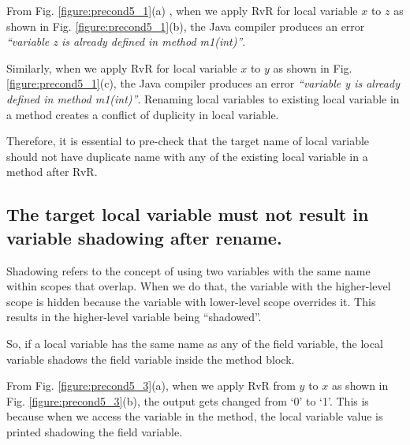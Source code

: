  
From Fig. \ref{figure:precond5_1}(a) , when we apply RvR for local variable $x$ to $z$ as shown in Fig. \ref{figure:precond5_1}(b), the Java compiler produces an error \textit{``variable z is already defined in method m1(int)''}. 

Similarly, when we apply RvR for local variable $x$ to $y$ as shown in Fig. \ref{figure:precond5_1}(c), the Java compiler produces an error \textit{``variable y is already defined in method m1(int)''}. Renaming local variables to existing local variable in a method creates a conflict of duplicity in local variable.

Therefore, it is essential to pre-check that the target name of local variable should not have duplicate name with any of the existing local variable in a method after RvR.


\subsection{The target local variable must not result in variable shadowing after rename.}
Shadowing refers to the concept of using two variables with the same name within scopes that overlap. When we do that, the variable with the higher-level scope is hidden because the variable with lower-level scope overrides it. This results in the higher-level variable being ``shadowed''. 

So, if a local variable has the same name as any of the field variable, the local variable shadows the field variable inside the method block. 

From Fig. \ref{figure:precond5_3}(a), when we apply RvR from $y$ to $x$ as shown in Fig. \ref{figure:precond5_3}(b), the output gets changed from `0' to `1'. This is because when we access the variable in the method, the local variable value is printed shadowing the field variable.

